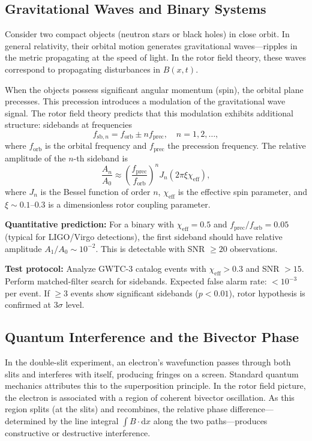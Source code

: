 \documentclass[11pt,a4paper]{article}
\numberwithin{equation}{section}
\theoremstyle{plain}
\theoremstyle{definition}
\theoremstyle{remark}
\newcommand{\dd}{\mathrm{d}}
\begin{document}
\subsection{Gravitational Waves and Binary Systems}

Consider two compact objects (neutron stars or black holes) in close orbit. In general relativity, their orbital motion generates gravitational waves---ripples in the metric propagating at the speed of light. In the rotor field theory, these waves correspond to propagating disturbances in $B(x,t)$.

When the objects possess significant angular momentum (spin), the orbital plane precesses. This precession introduces a modulation of the gravitational wave signal. The rotor field theory predicts that this modulation exhibits additional structure: sidebands at frequencies
\begin{equation}
f_{\mathrm{sb},n} = f_{\mathrm{orb}} \pm n f_{\mathrm{prec}}, \quad n = 1, 2, \ldots,
\end{equation}
where $f_{\mathrm{orb}}$ is the orbital frequency and $f_{\mathrm{prec}}$ the precession frequency. The relative amplitude of the $n$-th sideband is
\begin{equation}
\frac{A_n}{A_0} \approx \left(\frac{f_{\mathrm{prec}}}{f_{\mathrm{orb}}}\right)^n J_n(2\pi \xi \chi_{\mathrm{eff}}),
\end{equation}
where $J_n$ is the Bessel function of order $n$, $\chi_{\mathrm{eff}}$ is the effective spin parameter, and $\xi \sim 0.1$--$0.3$ is a dimensionless rotor coupling parameter.

\textbf{Quantitative prediction:} For a binary with $\chi_{\mathrm{eff}} = 0.5$ and $f_{\mathrm{prec}}/f_{\mathrm{orb}} = 0.05$ (typical for LIGO/Virgo detections), the first sideband should have relative amplitude $A_1/A_0 \sim 10^{-2}$. This is detectable with SNR $\geq 20$ observations.

\textbf{Test protocol:} Analyze GWTC-3 catalog events with $\chi_{\mathrm{eff}} > 0.3$ and SNR $> 15$. Perform matched-filter search for sidebands. Expected false alarm rate: $< 10^{-3}$ per event. If $\geq 3$ events show significant sidebands ($p < 0.01$), rotor hypothesis is confirmed at $3\sigma$ level.

\subsection{Quantum Interference and the Bivector Phase}

In the double-slit experiment, an electron's wavefunction passes through both slits and interferes with itself, producing fringes on a screen. Standard quantum mechanics attributes this to the superposition principle. In the rotor field picture, the electron is associated with a region of coherent bivector oscillation. As this region splits (at the slits) and recombines, the relative phase difference---determined by the line integral $\int B \cdot \dd x$ along the two paths---produces constructive or destructive interference.
\end{document}
